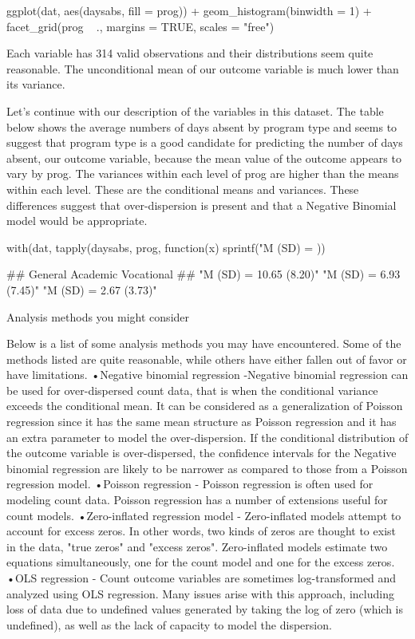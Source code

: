 ggplot(dat, aes(daysabs, fill = prog)) + geom_histogram(binwidth = 1) + facet_grid(prog ~ 
., margins = TRUE, scales = "free")



Each variable has 314 valid observations and their distributions seem quite reasonable. The unconditional mean of our outcome variable is much lower than its variance. 

Let's continue with our description of the variables in this dataset. The table below shows the average numbers of days absent by program type and seems to suggest that program type is a good candidate for predicting the number of days absent, our outcome variable, because the mean value of the outcome appears to vary by prog. The variances within each level of prog are higher than the means within each level. These are the conditional means and variances. These differences suggest that over-dispersion is present and that a Negative Binomial model would be appropriate. 



with(dat, tapply(daysabs, prog, function(x) {
	sprintf("M (SD) = %
}))

##                 General                Academic              Vocational 
## "M (SD) = 10.65 (8.20)"  "M (SD) = 6.93 (7.45)"  "M (SD) = 2.67 (3.73)"

Analysis methods you might consider

Below is a list of some analysis methods you may have encountered. Some of the methods listed are quite reasonable, while others have either fallen out of favor or have limitations. 
•Negative binomial regression -Negative binomial regression can be used for over-dispersed count data, that is when the conditional variance exceeds the conditional mean. It can be considered as a generalization of Poisson regression since it has the same mean structure as Poisson regression and it has an extra parameter to model the over-dispersion. If the conditional distribution of the outcome variable is over-dispersed, the confidence intervals for the Negative binomial regression are likely to be narrower as compared to those from a Poisson regression model.
•Poisson regression - Poisson regression is often used for modeling count data. Poisson regression has a number of extensions useful for count models. 
•Zero-inflated regression model - Zero-inflated models attempt to account for excess zeros. In other words, two kinds of zeros are thought to exist in the data, "true zeros" and "excess zeros". Zero-inflated models estimate two equations simultaneously, one for the count model and one for the excess zeros.
•OLS regression - Count outcome variables are sometimes log-transformed and analyzed using OLS regression. Many issues arise with this approach, including loss of data due to undefined values generated by taking the log of zero (which is undefined), as well as the lack of capacity to model the dispersion.

